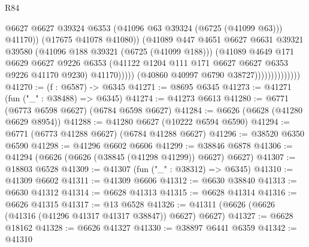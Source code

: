 \begin{lexlean}{R84}
\begin{coremodule}
                                          @6627
                                          @6627
                                          @39324
                                          @6353
                                          (@41096 @63 @39324 (@6725 (@41099 @63)))
                                          @41170))
                                      (@17675 @41078 @41080))
                                    (@41089
                                      @447
                                      @4651
                                      @6627
                                      @6631
                                      @39321
                                      @39580
                                      (@41096 @188 @39321 (@6725 (@41099 @188)))
                                      (@41089
                                        @4649
                                        @171
                                        @6629
                                        @6627
                                        @9226
                                        @6353
                                        (@41122
                                          @1204
                                          @111
                                          @171
                                          @6627
                                          @6627
                                          @6353
                                          @9226
                                          @41170
                                          @9230)
                                        @41170)))))
                              (@40860 @40997 @6790 @38727))))))))))))))
@41270 := (f : @6587) -> @6345
@41271 := @8695 @6345
@41273 := @41271 (fun ("_" : @38488) => @6345)
@41274 := @41273 @6613
@41280 := @6771 (@6773 @6598 @6627) (@6784 @6598 @6627)
@41284 := @6626 (@6628 (@41280 @6629 @8954))
@41288 := @41280 @6627 (@10222 @6594 @6590)
@41294 := @6771 (@6773 @41288 @6627) (@6784 @41288 @6627)
@41296 := @38520 @6350 @6590
@41298 := @41296 @6602 @6606
@41299 := @38846 @6878
@41306 := @41294 (@6626 (@6626 (@38845 (@41298 @41299)) @6627) @6627)
@41307 := @18803 @6528
@41309 := @41307 (fun ("_" : @38312) => @6345)
@41310 := @41309 @6602
@41311 := @41309 @6606
@41312 := @6630 @38840
@41313 := @6630 @41312
@41314 := @6628 @41313
@41315 := @6628 @41314
@41316 := @6626 @41315
@41317 := @13 @6528
@41326 := @41311 (@6626 (@6626 (@41316 (@41296 @41317 @41317 @38847)) @6627) @6627)
@41327 := @6628 @18162
@41328 := @6626 @41327
@41330 := @38897 @6441 @6359
@41342 := @41310

\end{coremodule}
\end{lexlean}
